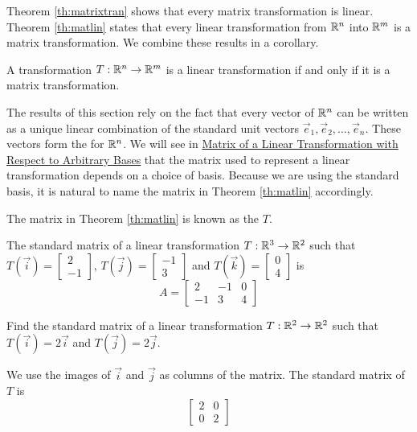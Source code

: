 \documentclass{ximera}
\begin{document}
Theorem \ref{th:matrixtran} shows that every matrix transformation is linear.  Theorem \ref{th:matlin} states that every linear transformation from $\mathbb{R}^n$ into $\mathbb{R}^m$ is a matrix transformation.  We combine these results in a corollary.

  \begin{corollary}\label{cor:lintransmattrans} A transformation $T:\mathbb{R}^n\rightarrow\mathbb{R}^m$ is a linear transformation if and only if it is a matrix transformation.
\end{corollary}  

The results of this section rely on the fact that every vector of $\mathbb{R}^n$ can be written as a unique linear combination of the standard unit vectors $\vec{e}_1,\vec{e}_2,\dots,\vec{e}_n$.  These vectors form the  for $\mathbb{R}^n$.  We will see in \href{\xmbaseurl/LTR-0080/main}{Matrix of a Linear Transformation with Respect to Arbitrary Bases} that the matrix used to represent a linear transformation depends on a choice of basis.  Because we are using the standard basis, it is natural to name the matrix in Theorem \ref{th:matlin} accordingly.

\begin{definition} \label{def:standardmatoflintrans}
  The matrix in Theorem \ref{th:matlin} is known as the  $T$.
  \end{definition}

\begin{example}\label{ex:findmatrix2}
 The standard matrix of a linear transformation $T:\mathbb{R}^3\rightarrow \mathbb{R}^2$ such that $T(\vec{i})=\begin{bmatrix}2\\-1\end{bmatrix}$, $T(\vec{j})=\begin{bmatrix}-1\\3\end{bmatrix}$ and $T(\vec{k})=\begin{bmatrix}0\\4\end{bmatrix}$ is
 $$A=\begin{bmatrix}2&-1&0\\-1&3&4\end{bmatrix}$$
 \end{example}
 
 \begin{example}\label{ex:findmatrix}
Find the standard matrix of a linear transformation $T:\mathbb{R}^2\rightarrow \mathbb{R}^2$ such that $T(\vec{i})=2\vec{i}$ and $T(\vec{j})=2\vec{j}$.  
\begin{explanation}
We use the images of $\vec{i}$ and $\vec{j}$ as columns of the matrix.  The standard matrix of $T$ is
$$\begin{bmatrix}2&0\\0&2\end{bmatrix}$$
\end{explanation}
\end{example}
 
\end{document}
